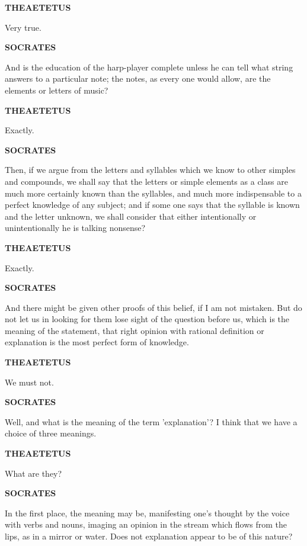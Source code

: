 \documentclass[11pt,letter]{article}
\begin{document}
\par \textbf{THEAETETUS}
\par   Very true.

\par \textbf{SOCRATES}
\par   And is the education of the harp-player complete unless he can tell what string answers to a particular note; the notes, as every one would allow, are the elements or letters of music?

\par \textbf{THEAETETUS}
\par   Exactly.

\par \textbf{SOCRATES}
\par   Then, if we argue from the letters and syllables which we know to other simples and compounds, we shall say that the letters or simple elements as a class are much more certainly known than the syllables, and much more indispensable to a perfect knowledge of any subject; and if some one says that the syllable is known and the letter unknown, we shall consider that either intentionally or unintentionally he is talking nonsense?

\par \textbf{THEAETETUS}
\par   Exactly.

\par \textbf{SOCRATES}
\par   And there might be given other proofs of this belief, if I am not mistaken. But do not let us in looking for them lose sight of the question before us, which is the meaning of the statement, that right opinion with rational definition or explanation is the most perfect form of knowledge.

\par \textbf{THEAETETUS}
\par   We must not.

\par \textbf{SOCRATES}
\par   Well, and what is the meaning of the term 'explanation'? I think that we have a choice of three meanings.

\par \textbf{THEAETETUS}
\par   What are they?

\par \textbf{SOCRATES}
\par   In the first place, the meaning may be, manifesting one's thought by the voice with verbs and nouns, imaging an opinion in the stream which flows from the lips, as in a mirror or water. Does not explanation appear to be of this nature?
\end{document}
